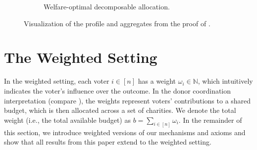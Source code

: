 \documentclass[11pt]{article}
\newcommand{\N}{\mathbb{N}}
\begin{document}
\begin{figure}
\begin{subfigure}[t]{.8\textwidth}
        \caption{Welfare-optimal decomposable allocation.} \label{fig:greedydecomp_social_welfare_opt}
    \end{subfigure}
    \caption{Visualization of the profile and aggregates from the proof of .}
\label{fig:greedydecomp_social_welfare}
\end{figure}


\section{The Weighted Setting} \label{app:weights}

In the weighted setting, each voter $i \in [n]$ has a weight $\omega_i \in \N$, which intuitively indicates the voter's influence over the outcome. In the donor coordination interpretation (compare \cite{BBG+22a,brandt2023balanced}), the weights represent voters' contributions to a shared budget, which is then allocated across a set of charities. We denote the total weight (i.e., the total available budget) as $b = \sum_{i \in [n]} \omega_i$. In the remainder of this section, we introduce weighted versions of our mechanisms and axioms and show that all results from this paper extend to the weighted setting.
\end{document}

